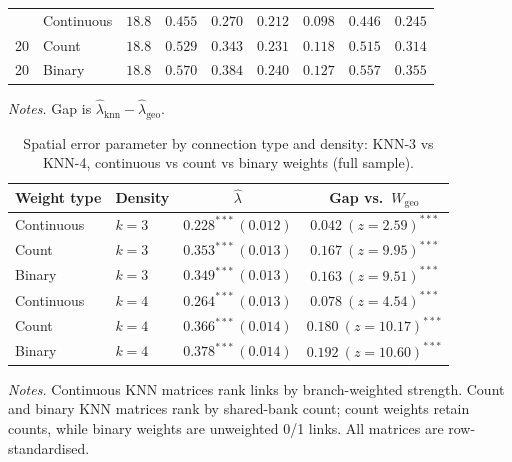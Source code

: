 \begin{table}[htbp]
\begin{tabular}{rlrrrrrrr}
    \addlinespace
    20 & Continuous & $18.8$ & $0.455$ & $0.270$ & $0.212$ & $0.098$ & $0.446$ & $0.245$ \\
    20 & Count & $18.8$ & $0.529$ & $0.343$ & $0.231$ & $0.118$ & $0.515$ & $0.314$ \\
    20 & Binary & $18.8$ & $0.570$ & $0.384$ & $0.240$ & $0.127$ & $0.557$ & $0.355$ \\
    \bottomrule
  \end{tabular}
  \begin{tablenotes}\footnotesize
  \item \emph{Notes.} Gap is $\hat\lambda_{\text{knn}}-\hat\lambda_{\text{geo}}$.
  \end{tablenotes}
\end{table}

\begin{table}[htbp]
  \centering
  \caption{Spatial error parameter by connection type and density: KNN-3 vs KNN-4, continuous vs count vs binary weights (full sample).}
  \label{tab:knn-type}
  \begin{tabular}{llcc}
    \toprule
    Weight type & Density & $\hat\lambda$ & Gap vs.\ $W_{\text{geo}}$ \\
    \midrule
    Continuous & $k=3$ & $0.228^{***}\,(0.012)$ & $0.042\ (z{=}2.59)^{***}$ \\
    Count & $k=3$ & $0.353^{***}\,(0.013)$ & $0.167\ (z{=}9.95)^{***}$ \\
    Binary & $k=3$ & $0.349^{***}\,(0.013)$ & $0.163\ (z{=}9.51)^{***}$ \\
    \addlinespace
    Continuous & $k=4$ & $0.264^{***}\,(0.013)$ & $0.078\ (z{=}4.54)^{***}$ \\
    Count & $k=4$ & $0.366^{***}\,(0.014)$ & $0.180\ (z{=}10.17)^{***}$ \\
    Binary & $k=4$ & $0.378^{***}\,(0.014)$ & $0.192\ (z{=}10.60)^{***}$ \\
    \bottomrule
  \end{tabular}
  \begin{tablenotes}\footnotesize
  \item \emph{Notes.} Continuous KNN matrices rank links by branch-weighted strength. Count and binary KNN matrices rank by shared-bank count; count weights retain counts, while binary weights are unweighted 0/1 links. All matrices are row-standardised.
  \end{tablenotes}
\end{table}

